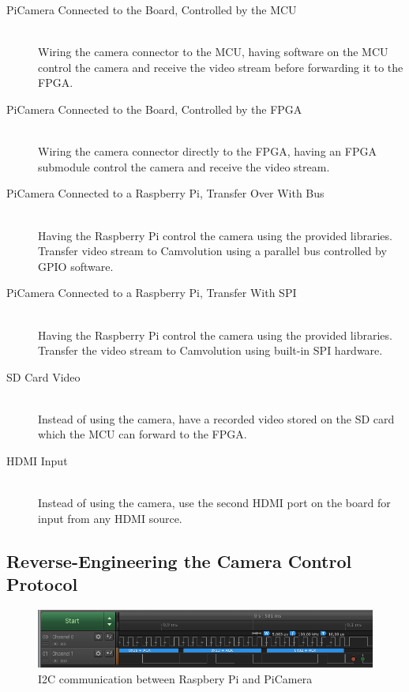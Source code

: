\begin{description}
    \item[PiCamera Connected to the Board, Controlled by the MCU]
        \hfill\\
        Wiring the camera connector to the MCU, having software on the MCU control the camera and receive the video stream before forwarding it to the FPGA.
    \item[PiCamera Connected to the Board, Controlled by the FPGA]
        \hfill\\
        Wiring the camera connector directly to the FPGA, having an FPGA submodule control the camera and receive the video stream.
    \item[PiCamera Connected to a Raspberry Pi, Transfer Over With Bus]
        \hfill\\
        Having the Raspberry Pi control the camera using the provided libraries.
        Transfer video stream to Camvolution using a parallel bus controlled by GPIO software.
    \item[PiCamera Connected to a Raspberry Pi, Transfer With SPI]
        \hfill\\
        Having the Raspberry Pi control the camera using the provided libraries.
        Transfer the video stream to Camvolution using built-in SPI hardware.
    \item[SD Card Video]
        \hfill\\
        Instead of using the camera, have a recorded video stored on the SD card which the MCU can forward to the FPGA.
    \item[HDMI Input]
        \hfill\\
        Instead of using the camera, use the second HDMI port on the board for input from any HDMI source.
\end{description}

\subsection{Reverse-Engineering the Camera Control Protocol}
\begin{figure}
    \centering
    \includegraphics[width=\linewidth]{img/logic/pi_cam_i2c}
    \caption{I2C communication between Raspbery Pi and PiCamera}
    \label{fig:PiCamI2C}
\end{figure}

